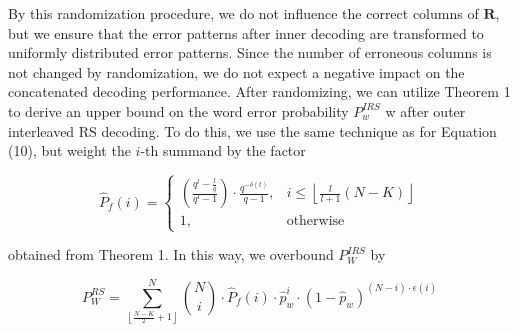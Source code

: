 \documentclass[fontsize=12pt]{article}
\begin{document}
By this randomization procedure, we do not influence the
correct columns of $\mathbf{R}$, but we ensure that the error patterns
after inner decoding are transformed to uniformly distributed
error patterns. Since the number of erroneous columns is not
changed by randomization, we do not expect a negative impact
on the concatenated decoding performance. After randomizing,
we can utilize Theorem 1 to derive an upper bound on
the word error probability 
 $P_w^{IRS}$
w after outer interleaved RS decoding. To do this, we use the same technique as
for Equation (10), but weight the $i$-th summand by the factor

$$
    \hat{P}_f(i)=
    \begin{cases}
       (\frac{q^l -\frac{l}{q}}{q^l-1}) \cdot \frac{q^{-\delta(t)}}{q-1}, & i \leq  \left \lfloor \frac{l}{l+1} ({N - K}) \right \rfloor \\
      1, & \text{otherwise}
    \end{cases}
  $$
  
  obtained from Theorem 1. In this way, we overbound 
$P_W^{IRS}$ by

\begin{equation}
P_W^{RS} = \sum_{ \left \lfloor \frac{N-K}{2}+1 \right \rfloor }^{N}\binom{N}{i}\cdot \hat{P}_f(i) \cdot \hat{p}_w^i\cdot(1-\hat{p}_w)^{(N-i)\cdot \epsilon(i) }
\end{equation}
\end{document}
